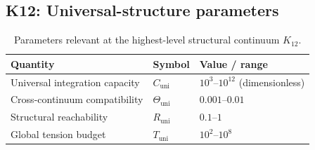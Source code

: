 
\subsection*{K12: Universal-structure parameters}

\begin{table}[h]
  \centering
  \caption{Parameters relevant at the highest-level structural continuum \(K_{12}\).}
  \label{tab:k12-universal-parameters}
  \begin{tabular}{lll}
    \hline
    Quantity & Symbol & Value / range \\
    \hline
    Universal integration capacity & \(C_\mathrm{uni}\)
        & \(10^3\text{–}10^{12}\) (dimensionless) \\
    Cross-continuum compatibility & \(\Theta_\mathrm{uni}\)
        & \(0.001\text{–}0.01\) \\
    Structural reachability & \(R_\mathrm{uni}\)
        & \(0.1\text{–}1\) \\
    Global tension budget & \(T_\mathrm{uni}\)
        & \(10^2\text{–}10^8\) \\
    \hline
  \end{tabular}
\end{table}
